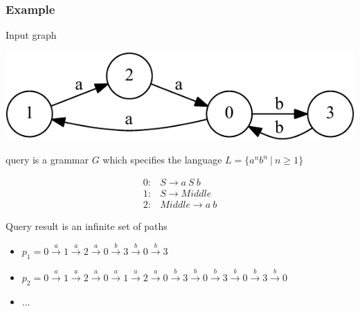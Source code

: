 \documentclass[xcolor=table,aspectratio=169]{beamer}
\begin{document}
\begin{frame}[fragile]
  \transwipe[direction=90]
  \frametitle{Example}
Input graph 
\vspace{-0.5cm}
\begin{center}
        \includegraphics[height=0.2\textheight]{pictures/input.pdf} 
\end{center}
query is a grammar $G$ which specifies the language $L=\{a^n b^n \ | \ n \geq 1\}$\\
\begin{center}
   \[
\begin{array}{rl} 
   0:& S \rightarrow a \ S \ b \\
   1:& S \rightarrow Middle \\
   2:& Middle \rightarrow a \ b
\end{array}
\]
\end{center}
\vspace{0.8em}
Query result is an infinite set of paths
\begin{itemize}
\item $p_1 = 0\xrightarrow{a}1\xrightarrow{a}2\xrightarrow{a}0\xrightarrow{b}3\xrightarrow{b}0\xrightarrow{b}3$
\item $p_2 = 0\xrightarrow{a}1\xrightarrow{a}2\xrightarrow{a}0\xrightarrow{a}1\xrightarrow{a}2\xrightarrow{a}0\xrightarrow{b}3\xrightarrow{b}0\xrightarrow{b}3\xrightarrow{b}0\xrightarrow{b}3\xrightarrow{b}0$
\item ...
\end{itemize}

\end{frame}
\end{document}
